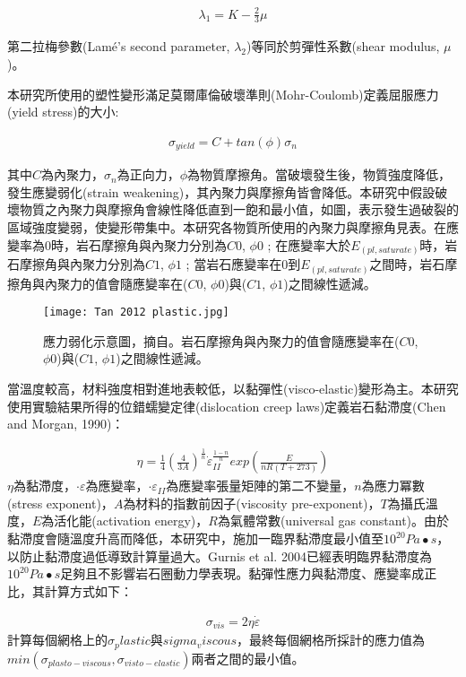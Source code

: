 \begin{align}
\lambda_1 = K - \frac{2}{3}\mu
\end{align}

第二拉梅參數(Lamé's second parameter, $\lambda_2$)等同於剪彈性系數(shear modulus, $\mu$)。

本研究所使用的塑性變形滿足莫爾庫倫破壞準則(Mohr-Coulomb)定義屈服應力(yield stress)的大小:

\begin{align}
    \sigma_{yield}=C+tan(\phi)\sigma_{n}\label{eqn:plastic deformation}
\end{align}

其中$C$為內聚力，$\sigma_n$為正向力，$\phi$為物質摩擦角。當破壞發生後，物質強度降低，發生應變弱化(strain weakening)，其內聚力與摩擦角皆會降低。本研究中假設破壞物質之內聚力與摩擦角會線性降低直到一飽和最小值，如圖，表示發生過破裂的區域強度變弱，使變形帶集中。本研究各物質所使用的內聚力與摩擦角見表。在應變率為$0$時，岩石摩擦角與內聚力分別為$C0$, $\phi0$ ; 在應變率大於$E_(pl,saturate)$時，岩石摩擦角與內聚力分別為$C1$, $\phi1$ ; 當岩石應變率在0到$E_(pl,saturate)$之間時，岩石摩擦角與內聚力的值會隨應變率在($C0$, $\phi0$)與($C1$, $\phi1$)之間線性遞減。
\begin{figure*}[ht!]
    \centering
    \texttt{[image: Tan 2012 plastic.jpg]}
    \caption{應力弱化示意圖，摘自\citealp{Tan2012}。岩石摩擦角與內聚力的值會隨應變率在($C0$, $\phi0$)與($C1$, $\phi1$)之間線性遞減。
    }
    \label{}
\end{figure*}

當溫度較高，材料強度相對進地表較低，以黏彈性(visco-elastic)變形為主。本研究使用實驗結果所得的位錯蠕變定律(dislocation creep laws)定義岩石黏滯度(Chen and Morgan, 1990)：

\begin{align}
   \eta=\frac{1}{4}(\frac{4}{3A})^{\frac{1}{n}} \dot\varepsilon_{II}^{\frac{1-n}{n}} exp(\frac{E}{nR(T+273)})
   \label{eqn:viscousity}
\end{align}
$\eta$為黏滯度，$\cdot\varepsilon$為應變率，$\cdot\varepsilon_{II}$為應變率張量矩陣的第二不變量，$n$為應力冪數(stress exponent)，$A$為材料的指數前因子(viscosity pre-exponent)，$T$為攝氏溫度，$E$為活化能(activation energy)，$R$為氣體常數(universal gas constant)。由於黏滯度會隨溫度升高而降低，本研究中，施加一臨界黏滯度最小值至$10^20 Pa∙s$，以防止黏滯度過低導致計算量過大。Gurnis et al. 2004已經表明臨界黏滯度為$10^20 Pa∙s$足夠且不影響岩石圈動力學表現。黏彈性應力與黏滯度、應變率成正比，其計算方式如下：	

\begin{align}
    \sigma_{vis} = 2\eta\dot\varepsilon \label{eqn:viscous tensor}
\end{align}
計算每個網格上的$\sigma_plastic$與$sigma_viscous$，最終每個網格所採計的應力值為$min(\sigma_{plasto-viscous}, \sigma_{visto-elastic})$兩者之間的最小值。
